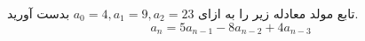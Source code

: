 \p
    تابع مولد معادله زیر را به ازای $a_0 = 4, a_1 = 9, a_2 = 23$ بدست آورید.
    $$a_n = 5a_{n-1} - 8a_{n-2} + 4a_{n-3}$$
